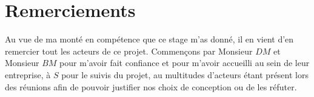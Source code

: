 
\chapter{Remerciements}

Au vue de ma monté en compétence que ce stage m'as donné, il en vient d'en remercier tout les acteurs de ce projet.\linebreak
Commençons par Monsieur \textit{$DM$} et Monsieur \textit{$BM$} pour m'avoir fait confiance et pour m'avoir accueilli au sein de leur entreprise, à \textit{$S$} pour le suivis du projet, au multitudes d'acteurs étant présent lors des réunions afin de pouvoir justifier nos choix de conception ou de les réfuter.\linebreak


\pagebreak